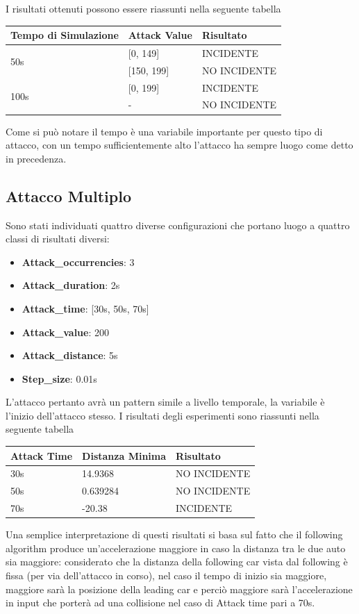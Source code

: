 I risultati ottenuti possono essere riassunti nella seguente tabella
 
\renewcommand{\arraystretch}{2}
\begin{center}
	\begin{tabular}{ |p{6cm}|p{3cm}|p{4cm}|  }
		\hline
		Tempo di Simulazione& Attack Value & Risultato \\
		\hline
		\multirow{2}{4em}{50s} & [0, 149] & INCIDENTE \\
		\cline{2-3}
		& [150, 199] & NO INCIDENTE \\
		\hline
		\multirow{2}{4em}{100s} & [0, 199] & INCIDENTE \\
		\cline{2-3}
		& - & NO INCIDENTE \\
		\hline
	\end{tabular}
\end{center}
Come si può notare il tempo è una variabile importante per questo tipo di attacco, con un tempo sufficientemente alto l'attacco ha sempre luogo come detto in precedenza.

\subsection{Attacco Multiplo}
Sono stati individuati quattro diverse configurazioni che portano luogo a quattro classi di risultati diversi:
\begin{itemize}
	\item \textbf{Attack\_occurrencies}: 3
	\item \textbf{Attack\_duration}: 2s
	\item \textbf{Attack\_time}: [30s, 50s, 70s]
	\item \textbf{Attack\_value}: 200
	\item \textbf{Attack\_distance}: 5s
	\item \textbf{Step\_size}: 0.01s
\end{itemize}
L'attacco pertanto avrà un pattern simile a livello temporale, la variabile è l'inizio dell'attacco stesso. I risultati degli esperimenti sono riassunti nella seguente tabella
\renewcommand{\arraystretch}{1.5}
\begin{center}
	\begin{tabular}{ |p{4cm}|p{5cm}| p{4cm}|  }
		\hline
		Attack Time & Distanza Minima & Risultato \\
		\hline
		30s & 14.9368 & NO INCIDENTE \\
		\hline
		50s & 0.639284 & NO INCIDENTE \\
		\hline
		70s & -20.38 & INCIDENTE \\
		\hline
	\end{tabular}
\end{center}
Una semplice interpretazione di questi risultati si basa sul fatto che il following algorithm produce un'accelerazione maggiore in caso la distanza tra le due auto sia maggiore: considerato che la distanza della following car vista dal following è fissa (per via dell'attacco in corso), nel caso il tempo di inizio sia maggiore, maggiore sarà la posizione della leading car e perciò maggiore sarà l'accelerazione in input che porterà ad una collisione nel caso di Attack time pari a 70s.